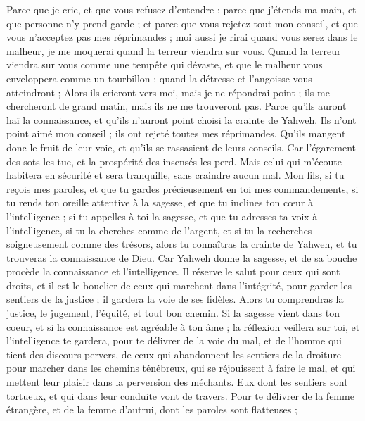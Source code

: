 \begin{multicols}{2}
Parce que je crie, et que vous refusez d'entendre ; parce que j'étends ma main, et que personne n'y prend garde ;
et parce que vous rejetez tout mon conseil, et que vous n'acceptez pas mes réprimandes ;
moi aussi je rirai quand vous serez dans le malheur, je me moquerai quand la terreur viendra sur vous.
Quand la terreur viendra sur vous comme une tempête qui dévaste, et que le malheur vous enveloppera comme un tourbillon ; quand la détresse et l'angoisse vous atteindront ;
Alors ils crieront vers moi, mais je ne répondrai point ; ils me chercheront de grand matin, mais ils ne me trouveront pas.
Parce qu'ils auront haï la connaissance, et qu'ils n'auront point choisi la crainte de Yahweh.
Ils n'ont point aimé mon conseil ; ils ont rejeté toutes mes réprimandes.
Qu'ils mangent donc le fruit de leur voie, et qu'ils se rassasient de leurs conseils.
Car l'égarement des sots les tue, et la prospérité des insensés les perd.
Mais celui qui m'écoute habitera en sécurité et sera tranquille, sans craindre aucun mal.
\VerseOne{}Mon fils, si tu reçois mes paroles, et que tu gardes précieusement en toi mes commandements,
si tu rends ton oreille attentive à la sagesse, et que tu inclines ton cœur à l'intelligence ;
si tu appelles à toi la sagesse, et que tu adresses ta voix à l'intelligence,
si tu la cherches comme de l'argent, et si tu la recherches soigneusement comme des trésors,
alors tu connaîtras la crainte de Yahweh, et tu trouveras la connaissance de Dieu.
Car Yahweh donne la sagesse, et de sa bouche procède la connaissance et l'intelligence.
Il réserve le salut pour ceux qui sont droits, et il est le bouclier de ceux qui marchent dans l'intégrité,
pour garder les sentiers de la justice ; il gardera la voie de ses fidèles.
Alors tu comprendras la justice, le jugement, l'équité, et tout bon chemin.
Si la sagesse vient dans ton coeur, et si la connaissance est agréable à ton âme ;
la réflexion veillera sur toi, et l'intelligence te gardera,
pour te délivrer de la voie du mal, et de l'homme qui tient des discours pervers,
de ceux qui abandonnent les sentiers de la droiture pour marcher dans les chemins ténébreux,
qui se réjouissent à faire le mal, et qui mettent leur plaisir dans la perversion des méchants.
Eux dont les sentiers sont tortueux, et qui dans leur conduite vont de travers.
Pour te délivrer de la femme étrangère, et de la femme d'autrui, dont les paroles sont flatteuses ;

\end{multicols}
